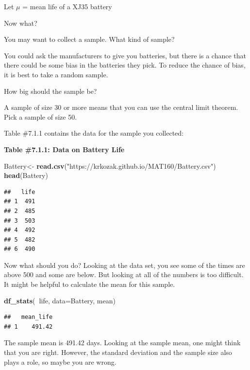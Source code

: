 \documentclass[]{book}
\newenvironment{Shaded}{\begin{snugshade}}{\end{snugshade}}
\newcommand{\DataTypeTok}[1]{\textcolor[rgb]{0.13,0.29,0.53}{#1}}
\newcommand{\KeywordTok}[1]{\textcolor[rgb]{0.13,0.29,0.53}{\textbf{#1}}}
\newcommand{\NormalTok}[1]{#1}
\newcommand{\OperatorTok}[1]{\textcolor[rgb]{0.81,0.36,0.00}{\textbf{#1}}}
\newcommand{\StringTok}[1]{\textcolor[rgb]{0.31,0.60,0.02}{#1}}
\begin{document}
Let \(\mu\) = mean life of a XJ35 battery

Now what?

You may want to collect a sample. What kind of sample?

You could ask the manufacturers to give you batteries, but there is a chance that there could be some bias in the batteries they pick. To reduce the chance of bias, it is best to take a random sample.

How big should the sample be?

A sample of size 30 or more means that you can use the central limit theorem. Pick a sample of size 50.

Table \#7.1.1 contains the data for the sample you collected:

\textbf{Table \#7.1.1: Data on Battery Life}

\begin{Shaded}
\begin{Highlighting}[]
\NormalTok{Battery<-}\StringTok{ }\KeywordTok{read.csv}\NormalTok{(}\StringTok{"https://krkozak.github.io/MAT160/Battery.csv"}\NormalTok{)}
\KeywordTok{head}\NormalTok{(Battery)}
\end{Highlighting}
\end{Shaded}

\begin{verbatim}
##   life
## 1  491
## 2  485
## 3  503
## 4  492
## 5  482
## 6  490
\end{verbatim}

Now what should you do? Looking at the data set, you see some of the times are above 500 and some are below. But looking at all of the numbers is too difficult. It might be helpful to calculate the mean for this sample.

\begin{Shaded}
\begin{Highlighting}[]
\KeywordTok{df_stats}\NormalTok{(}\OperatorTok{~}\NormalTok{life, }\DataTypeTok{data=}\NormalTok{Battery, mean)}
\end{Highlighting}
\end{Shaded}

\begin{verbatim}
##   mean_life
## 1    491.42
\end{verbatim}

The sample mean is 491.42 days. Looking at the sample mean, one might think that you are right. However, the standard deviation and the sample size also plays a role, so maybe you are wrong.
\end{document}
